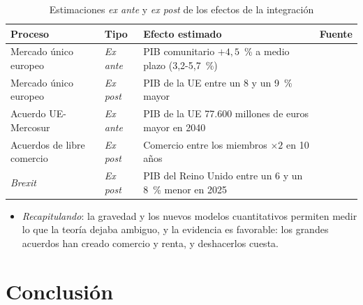 \documentclass[11pt]{article}
\begin{document}
\begin{table}[H]
\centering
\caption{Estimaciones \emph{ex ante} y \emph{ex post} de los efectos de la integración}\label{tab:ex-ante-ex-post}
\footnotesize
\renewcommand{\arraystretch}{1.25}
\begin{tabular}{>{\raggedright\arraybackslash}m{3.6cm}>{\centering\arraybackslash}m{1.6cm}>{\raggedright\arraybackslash}m{5.2cm}>{\raggedright\arraybackslash}m{3.6cm}}
\toprule
\rowcolor{tceeazulpalido}\textbf{Proceso} & \textbf{Tipo} & \textbf{Efecto estimado} & \textbf{Fuente}\\
\midrule
Mercado único europeo & \emph{Ex ante} & PIB comunitario \textcolor{tceeverde}{$+4{,}5$~\%} a medio plazo (3,2-5,7~\%) & \textcite{Emerson1988Economics}\\
Mercado único europeo & \emph{Ex post} & PIB de la UE \textcolor{tceeverde}{entre un 8 y un 9~\%} mayor & \textcite{intVeld2019Quantifying}\\
Acuerdo UE-Mercosur & \emph{Ex ante} & PIB de la UE \textcolor{tceeverde}{77.600 millones de euros} mayor en 2040 & \textcite{CE2025MercosurAnalisis}\\
Acuerdos de libre comercio & \emph{Ex post} & Comercio entre los miembros \textcolor{tceeverde}{$\times 2$} en 10 años & \textcite{BaierBergstrand2007}\\
\emph{Brexit} & \emph{Ex post} & PIB del Reino Unido \textcolor{tceerojo}{entre un 6 y un 8~\%} menor en 2025 & \textcite{Bloom2025Economic}\\
\bottomrule
\end{tabular}

\smallskip
{}
\end{table}

\begin{itemize}
\item \emph{Recapitulando}: la gravedad y los nuevos modelos cuantitativos permiten medir lo que la teoría dejaba ambiguo, y la evidencia es favorable: los grandes acuerdos han creado comercio y renta, y deshacerlos cuesta.
\end{itemize}

\section*{Conclusión}
\end{document}
